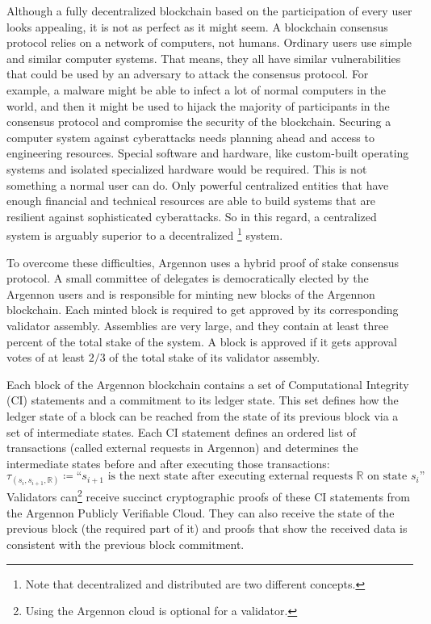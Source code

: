 Although a fully decentralized blockchain based on the participation of every user looks appealing, it is not as perfect
as it might seem. A blockchain consensus protocol relies on a network of computers, not humans. Ordinary users use
simple and similar computer systems. That means, they all have similar vulnerabilities that could be used by an
adversary to attack the consensus protocol. For example, a malware might be
able to infect a lot of normal computers in the world, and then it might be used to hijack the majority of
participants in the consensus protocol and compromise the security of the blockchain. Securing a computer
system against cyberattacks needs planning ahead and access to engineering resources. Special software and hardware,
like custom-built operating systems and isolated specialized hardware would be required. This is not something a normal
user can do. Only powerful centralized entities that have enough financial and technical resources are able to build
systems that are resilient against sophisticated cyberattacks. So in this regard, a centralized system is arguably
superior to a decentralized \footnote{Note
that decentralized and distributed are two different concepts.} system.

To overcome these difficulties, Argennon uses a hybrid proof of stake consensus protocol. A small committee of
delegates is democratically elected
by the Argennon users and is responsible for minting new blocks of the Argennon blockchain. Each
minted block is required to get approved by its corresponding validator assembly. Assemblies are very large, and they
contain at least three percent of the total stake of the system. A block is approved if it gets approval votes of at
least \(2/3\) of the total stake of its validator assembly.

Each block of the Argennon blockchain contains a set of Computational Integrity (CI) statements and a commitment to
its ledger state. This set defines how
the ledger state of a block can be reached from the state of its previous block via a set of intermediate states.
Each CI statement defines an ordered list of transactions (called external requests in Argennon) and determines
the intermediate states before and after executing those transactions:
\[
    \tau_{(s_i,s_{i+1},\mathbb{R})} \coloneqq \text{``$s_{i+1}$ is the next state after executing external requests
        $\mathbb{R}$ on state $s_i$''}
\]
Validators can\footnote{Using the Argennon cloud is optional for a validator.} receive succinct cryptographic proofs
of these CI statements from the Argennon Publicly Verifiable Cloud. They can also receive the state of the previous
block (the required part of it) and proofs that show the received data is consistent with the previous block commitment.

